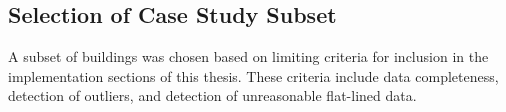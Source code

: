 \subsection{Selection of Case Study Subset}
\label{casestudysubset}

A subset of buildings was chosen based on limiting criteria for inclusion in the implementation sections of this thesis. These criteria include data completeness, detection of outliers, and detection of unreasonable flat-lined data.